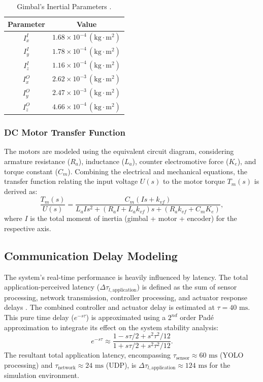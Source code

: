 \documentclass[conference]{IEEEtran}
\begin{document}
\begin{table}[!t]
\caption{Gimbal's Inertial Parameters \cite{espinosa2016diseno}.}
\label{tabelaparametrogimbal}
\centering
\begin{tabular}{|c||c|} 
    \hline
    \textbf{Parameter} & \textbf{Value} \\ [0.5ex] 
    \hline\hline
    $I^I_x$ & $1.68 \times 10^{-4} \, (\text{kg} \cdot \text{m}^2)$\\ 
    \hline
    $I^I_y$ & $1.78 \times 10^{-4} \, (\text{kg} \cdot \text{m}^2)$ \\
    \hline
    $I^I_z$ & $1.16 \times 10^{-4} \, (\text{kg} \cdot \text{m}^2)$ \\
    \hline
    $I^O_x$ & $2.62 \times 10^{-3} \, (\text{kg} \cdot \text{m}^2)$ \\
    \hline
    $I^O_y$ & $2.47 \times 10^{-3} \, (\text{kg} \cdot \text{m}^2)$ \\
    \hline
    $I^O_z$ & $4.66 \times 10^{-4} \, (\text{kg} \cdot \text{m}^2)$ \\
    \hline
\end{tabular}
\end{table}

\subsubsection{DC Motor Transfer Function}
The motors are modeled using the equivalent circuit diagram, considering armature resistance ($R_a$), inductance ($L_a$), counter electromotive force ($K_e$), and torque constant ($C_m$). Combining the electrical and mechanical equations, the transfer function relating the input voltage $U(s)$ to the motor torque $T_m(s)$ is derived as:
\begin{equation}
\label{eq:FT_motor_torque}
\frac{T_{m}(s)}{U(s)} = \frac{C_m (I s + k_{vf})}{L_a I s^2 + (R_a I + L_a k_{vf})s + (R_a k_{vf} + C_m K_e)},
\end{equation}
where $I$ is the total moment of inertia (gimbal + motor + encoder) for the respective axis.

\subsection{Communication Delay Modeling}
The system's real-time performance is heavily influenced by latency. The total application-perceived latency ($\Delta \tau_{l,\text{application}}$) is defined as the sum of sensor processing, network transmission, controller processing, and actuator response delays \cite{KIESEL2022238}. The combined controller and actuator delay is estimated at $\tau = 40 \text{ ms}$. This pure time delay ($e^{-s\tau}$) is approximated using a $2^{nd}$ order Padé approximation to integrate its effect on the system stability analysis:
\begin{equation}
e^{-s\tau} \approx \frac{1 - s\tau/2 + s^2\tau^2/12}{1 + s\tau/2 + s^2\tau^2/12}. 
\end{equation}
The resultant total application latency, encompassing $\tau_{\text{sensor}} \approx 60 \text{ ms}$ (YOLO processing) and $\tau_{\text{network}} \approx 24 \text{ ms}$ (UDP), is $\Delta \tau_{l,\text{application}} \approx 124 \text{ ms}$ for the simulation environment.
\end{document}

